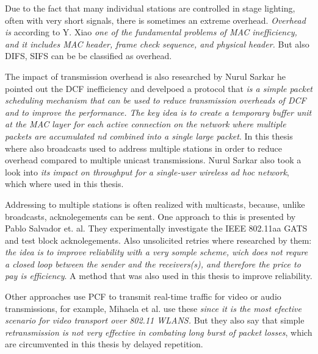 Due to the fact that many individual stations are controlled in stage lighting, often with very short signals, there is sometimes an extreme overhead.
\emph{Overhead is} 
according to Y. Xiao \cite{PerformanceEnhancement}
\emph{one of the fundamental problems of MAC inefficiency, and it includes MAC header, frame check sequence, and physical header.}
But also DIFS, SIFS can be be classified as overhead.

The impact of transmission overhead is also researched by Nurul Sarkar \cite{TheImpactOfOverheads}
he pointed out the DCF inefficiency and develpoed a protocol that
\emph{is a simple packet scheduling mechanism that can be used to reduce transmission overheads of DCF and to improve the performance. 
The key idea is to create a temporary buffer unit at the MAC layer for each active connection on the network 
where multiple packets are accumulated nd combined into a single large packet}.
In this thesis where also broadcasts used to address multiple stations in order to reduce overhead compared to multiple unicast transmissions.
Nurul Sarkar \cite{TheImpactOfOverheads} also took a look into 
\emph{its impact on throughput for a single-user wireless ad hoc network},
which where used in this thesis.

Addressing to multiple stations is often realized with multicasts, 
because, unlike broadcasts, acknolegements can be sent. One approach to this is presented by Pablo Salvador et. al. 
\cite{AFirstImplementation}
They experimentally investigate the IEEE 802.11aa GATS and test block acknolegements.
Also unsolicited retries where researched by them: 
\emph{the idea is to improve reliability with a very somple scheme, wich does not requre a 
closed loop between the sender and the receivers(s), and therefore the price to pay is efficiency}.
A method that was also used in this thesis to improve reliability.

Other approaches use PCF to transmit real-time traffic for video or audio transmissions,
for example, Mihaela et al. \cite{AdaptiveCrossLayer} use these 
\emph{since it is the most efective scenario for video transport over 802.11 WLANS.}
But they also say that simple 
\emph{retransmission is not very effective in combating long burst of packet losses},
which are circumvented in this thesis by delayed repetition.



